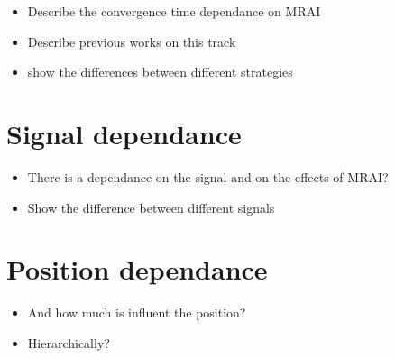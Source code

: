 \begin{itemize}
    \item Describe the convergence time dependance on MRAI
    \item Describe previous works on this track
    \item show the differences between different strategies
\end{itemize}

\section{Signal dependance}
\label{sec:bgp_mrai_signal_dependance}

\begin{itemize}
    \item There is a dependance on the signal and on the effects
    of MRAI?
    \item Show the difference between different signals
\end{itemize}

\section{Position dependance}
\label{sec:position_dependance}

\begin{itemize}
    \item And how much is influent the position?
    \item Hierarchically?
\end{itemize}